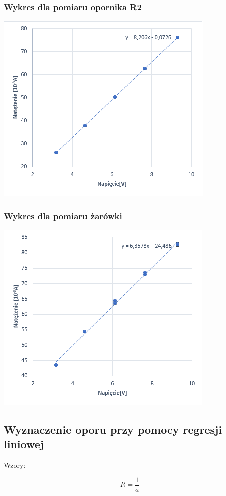 \documentclass[12pt]{article}
\begin{document}
\subsubsection{Wykres dla pomiaru opornika R2}
\includegraphics{pomiar2.png}

\subsubsection{Wykres dla pomiaru żarówki}
\includegraphics{pomiar3.png}

\subsection{Wyznaczenie oporu przy pomocy regresji liniowej}
Wzory:

$$ R = \frac{1}{a} $$
\end{document}
